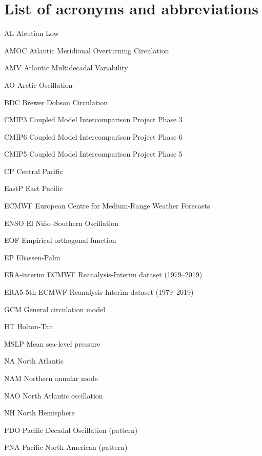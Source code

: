 \chapter*{List of acronyms and abbreviations}

\begin{description*}

\item[AL] Aleutian Low
\item[AMOC] Atlantic Meridional Overturning Circulation
\item[AMV] Atlantic Multidecadal Variability
\item[AO] Arctic Oscillation
\item[BDC] Brewer Dobson Circulation
\item[CMIP3] Coupled Model Intercomparison Project Phase 3
\item[CMIP6] Coupled Model Intercomparison Project Phase 6
\item[CMIP5] Coupled Model Intercomparison Project Phase 5
\item[CP] Central Pacific
\item[EastP] East Pacific
\item[ECMWF] European Centre for Medium-Range Weather Forecasts
\item[ENSO] El Ni\~no--Southern Oscillation
\item[EOF] Empirical orthogonal function
\item[EP] Eliassen-Palm
\item[ERA-interim] ECMWF Reanalysis-Interim dataset (1979--2019)
\item[ERA5] 5th ECMWF Reanalysis-Interim dataset (1979--2019)
\item[GCM] General circulation model
\item[HT] Holton-Tan
\item[MSLP] Mean sea-level pressure
\item[NA] North Atlantic
\item[NAM] Northern annular mode
\item[NAO] North Atlantic oscillation
\item[NH] North Hemisphere
\item[PDO] Pacific Decadal Oscillation (pattern)
\item[PNA] Pacific-North American (pattern)

\end{description*}
